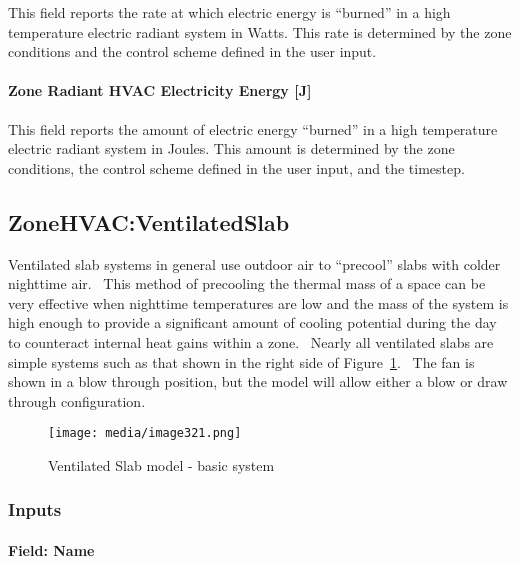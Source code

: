 This field reports the rate at which electric energy is ``burned'' in a high temperature electric radiant system in Watts. This rate is determined by the zone conditions and the control scheme defined in the user input.

\paragraph{Zone Radiant HVAC Electricity Energy {[}J{]}}\label{zone-radiant-hvac-electric-energy-j-1}

This field reports the amount of electric energy ``burned'' in a high temperature electric radiant system in Joules. This amount is determined by the zone conditions, the control scheme defined in the user input, and the timestep.

\subsection{ZoneHVAC:VentilatedSlab}\label{zonehvacventilatedslab}

Ventilated slab systems in general use outdoor air to ``precool'' slabs with colder nighttime air.~ This method of precooling the thermal mass of a space can be very effective when nighttime temperatures are low and the mass of the system is high enough to provide a significant amount of cooling potential during the day to counteract internal heat gains within a zone.~ Nearly all ventilated slabs are simple systems such as that shown in the right side of Figure~\ref{fig:ventilated-slab-model-basic-system}.~ The fan is shown in a blow through position, but the model will allow either a blow or draw through configuration.

\begin{figure}[hbtp] %
\centering
\texttt{[image: media/image321.png]}
\caption{Ventilated Slab model - basic system \protect \label{fig:ventilated-slab-model-basic-system}}
\end{figure}

\subsubsection{Inputs}\label{inputs-10-014}

\paragraph{Field: Name}\label{field-name-10-012}

